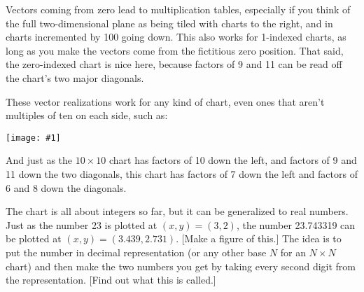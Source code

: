 \documentclass[12pt]{article}
\newcommand{\showchart}[1]{\texttt{[image: \#1]}}
\begin{document}
Vectors coming from zero lead to multiplication tables, especially if
you think of the full two-dimensional plane as being tiled with charts
to the right, and in charts incremented by 100 going down.  This also
works for 1-indexed charts, as long as you make the vectors come from
the fictitious zero position.  That said, the zero-indexed chart is
nice here, because factors of 9 and 11 can be read off the chart's two
major diagonals.

These vector realizations work for any kind of chart, even ones that
aren't multiples of ten on each side, such as:
\begin{center}
\showchart{hundreds_chart_7x7_base10.pdf}
\end{center}
And just as the $10\times 10$ chart has factors of 10 down the left,
and factors of 9 and 11 down the two diagonals, this chart has factors
of 7 down the left and factors of 6 and 8 down the diagonals.

The chart is all about integers so far, but it can be generalized to
real numbers.  Just as the number 23 is plotted at $(x,y) = (3,2)$,
the number 23.743319 can be plotted at $(x,y) = (3.439, 2.731)$.
[Make a figure of this.]  The idea is to put the number in decimal
representation (or any other base $N$ for an $N\times N$ chart) and
then make the two numbers you get by taking every second digit from
the representation.  [Find out what this is called.]
\end{document}
